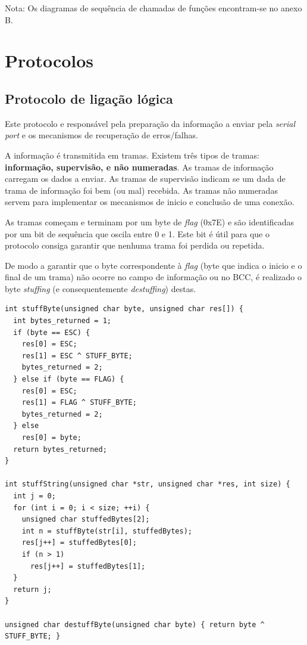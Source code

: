 \documentclass[11pt]{report}
\begin{document}
Nota: Os diagramas de sequência de chamadas de funções encontram-se no anexo B.

{\let\clearpage\relax \chapter{Protocolos}}

\section{Protocolo de ligação lógica}

Este protocolo e responsável pela preparação da informação a enviar pela
\textit{serial port} e os mecanismos de recuperação de erros/falhas.

A informação é transmitida em tramas. Existem três tipos de tramas:
\textbf{informação, supervisão, e não numeradas}. As tramas de informação
carregam os dados a enviar. As tramas de supervisão indicam se um dada de
trama de informação foi bem (ou mal) recebida. As tramas não numeradas servem
para implementar os mecanismos de inicio e conclusão de uma conexão.

As tramas começam e terminam por um byte de \textit{flag} (0x7E) e são
identificadas por um bit de sequência que oscila entre 0 e 1. Este bit é útil
para que o protocolo consiga garantir que nenhuma trama foi perdida ou repetida.

De modo a garantir que o byte correspondente à \textit{flag} (byte que indica
o inicio e o final de um trama) não ocorre no campo de informação ou no BCC,
é realizado o byte \textit{stuffing} (e consequentemente \textit{destuffing})
destas.
\begin{lstlisting}
int stuffByte(unsigned char byte, unsigned char res[]) {
  int bytes_returned = 1;
  if (byte == ESC) {
    res[0] = ESC;
    res[1] = ESC ^ STUFF_BYTE;
    bytes_returned = 2;
  } else if (byte == FLAG) {
    res[0] = ESC;
    res[1] = FLAG ^ STUFF_BYTE;
    bytes_returned = 2;
  } else
    res[0] = byte;
  return bytes_returned;
}

int stuffString(unsigned char *str, unsigned char *res, int size) {
  int j = 0;
  for (int i = 0; i < size; ++i) {
    unsigned char stuffedBytes[2];
    int n = stuffByte(str[i], stuffedBytes);
    res[j++] = stuffedBytes[0];
    if (n > 1)
      res[j++] = stuffedBytes[1];
  }
  return j;
}

unsigned char destuffByte(unsigned char byte) { return byte ^ STUFF_BYTE; }
\end{lstlisting}
\end{document}
